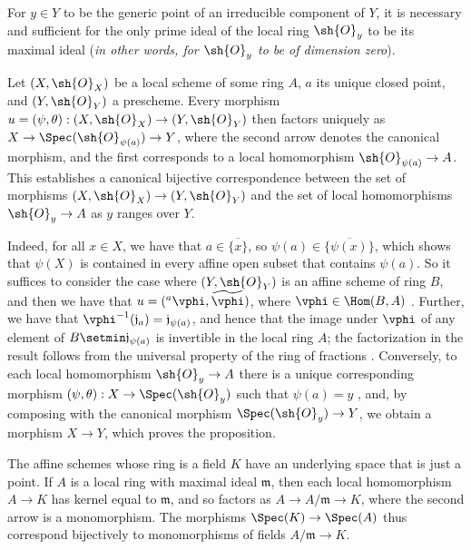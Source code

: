 \begin{corollary}[2.4.3]
\label{I.2.4.3}
For $y\in Y$ to be the generic point of an irreducible component of $Y$, it is necessary and sufficient for the only prime ideal of the local ring $\sh{O}_y$ to be its maximal ideal (\emph{in other words, for $\sh{O}_y$ to be of \emph{dimension zero}}).
\end{corollary}

\begin{proposition}[2.4.4]
\label{I.2.4.4}
Let $(X,\sh{O}_X)$ be a local scheme of some ring $A$, $a$ its unique closed point, and $(Y,\sh{O}_Y)$ a prescheme.
Every morphism $u=(\psi,\theta):(X,\sh{O}_X)\to(Y,\sh{O}_Y)$ then factors uniquely as $X\to\Spec(\sh{O}_{\psi(a)})\to Y$, where the second arrow denotes the canonical morphism, and the first corresponds to a local homomorphism $\sh{O}_{\psi(a)}\to A$.
This establishes a canonical bijective correspondence between the set of morphisms $(X,\sh{O}_X)\to(Y,\sh{O}_Y)$ and the set of local homomorphisms $\sh{O}_y\to A$ as $y$ ranges over $Y$.
\end{proposition}

Indeed, for all $x\in X$, we have that $a\in\overline{\{x\}}$, so $\psi(a)\in\overline{\{\psi(x)\}}$, which shows that $\psi(X)$ is contained in every affine open subset that contains $\psi(a)$.
So it suffices to consider the case where $(Y,\sh{O}_Y)$ is an affine scheme of ring $B$, and then we have that $u=({}^a\vphi,\widetilde{\vphi})$, where $\vphi\in\Hom(B,A)$ .
Further, we have that $\vphi^{-1}(\mathfrak{j}_a)=\mathfrak{j}_{\psi(a)}$, and hence that the image under $\vphi$ of any element of $B\setmin\mathfrak{j}_{\psi(a)}$ is invertible in the local ring $A$;
the factorization in the result follows from the universal property of the ring of fractions .
Conversely, to each local homomorphism $\sh{O}_y\to A$ there is a unique corresponding morphism $(\psi,\theta):X\to\Spec(\sh{O}_y)$ such that $\psi(a)=y$ , and, by composing with the canonical morphism $\Spec(\sh{O}_y)\to Y$, we obtain a morphism $X\to Y$, which proves the proposition.

\begin{env}[2.4.5]
\label{I.2.4.5}
The affine schemes whose ring is a field $K$ have an underlying space that is just a point.
If $A$ is a local ring with maximal ideal $\mathfrak{m}$, then each local homomorphism $A\to K$ has kernel equal to $\mathfrak{m}$, and so factors as $A\to A/\mathfrak{m}\to K$, where the second arrow is a monomorphism.
The morphisms $\Spec(K)\to\Spec(A)$ thus correspond bijectively to monomorphisms of fields $A/\mathfrak{m}\to K$.
\end{env}

